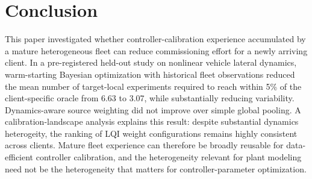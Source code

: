 \section{Conclusion}
This paper investigated whether controller-calibration experience accumulated by a mature heterogeneous fleet can reduce commissioning effort for a newly arriving client. In a pre-registered held-out study on nonlinear vehicle lateral dynamics, warm-starting Bayesian optimization with historical fleet observations reduced the mean number of target-local experiments required to reach within 5\% of the client-specific oracle from 6.63 to 3.07, while substantially reducing variability. Dynamics-aware source weighting did not improve over simple global pooling. A calibration-landscape analysis explains this result: despite substantial dynamics heterogeity, the ranking of LQI weight configurations remains highly consistent across clients. Mature fleet experience can therefore be broadly reusable for data-efficient controller calibration, and the heterogeneity relevant for plant modeling need not be the heterogeneity that matters for controller-parameter optimization.




